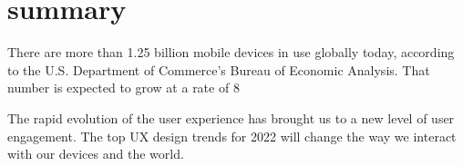 \documentclass{article}
\begin{document}
 \section{summary}
 There are more than 1.25 billion mobile devices in use globally today, according to the U.S. Department of Commerce’s Bureau of Economic Analysis. That number is expected to grow at a rate of 8%

 The rapid evolution of the user experience has brought us to a new level of user engagement. The top UX design trends for 2022 will change the way we interact with our devices and the world.
\end{document}
